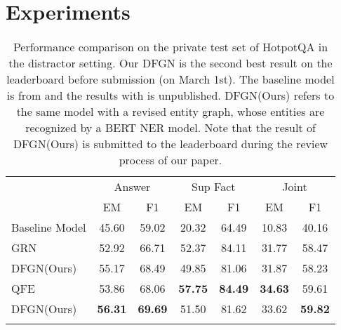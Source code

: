 \documentclass[11pt,a4paper]{article}
\begin{document}
\section{Experiments}
\label{sec:exp}
\begin{table*}[t]
    \centering 
	\begin{tabular}{ccccccc}
		\Xhline{1pt}
		\multirow{2}{*}{Model} & \multicolumn{2}{c}{Answer} 	& \multicolumn{2}{c}{Sup Fact} & \multicolumn{2}{c}{Joint} \\ \cline{2-7}
		& EM & F1 & EM & F1 & EM & F1\\ \hline
		\multicolumn{1}{l}{Baseline Model} & 45.60 & 59.02 & 20.32 & 64.49 & 10.83 & 40.16 \\
\multicolumn{1}{l}{GRN} & 52.92 & 66.71 & 52.37 & 84.11 & 31.77 & 58.47 \\
		\multicolumn{1}{l}{DFGN(Ours)} & 55.17 & 68.49 & 49.85 & 81.06 & 31.87 & 58.23 \\
		\multicolumn{1}{l}{QFE} & 53.86 & 68.06 & \textbf{57.75} & \textbf{84.49} & \textbf{34.63} & 59.61\\ \hline
		\multicolumn{1}{l}{DFGN(Ours)} & \textbf{56.31} & \textbf{69.69} & 51.50 & 81.62 & 33.62 & \textbf{59.82}\\
		\Xhline{1pt}
	\end{tabular}
	\caption{Performance comparison on the private test set of HotpotQA in the distractor setting. Our DFGN is the second best result on the leaderboard before submission (on March 1st). The baseline model is from  and the results with  is unpublished. DFGN(Ours) refers to the same model with a revised entity graph, whose entities are recognized by a BERT NER model. Note that the result of DFGN(Ours) is submitted to the leaderboard during the review process of our paper.} 
	\label{table:main}
\end{table*}
\end{document}
